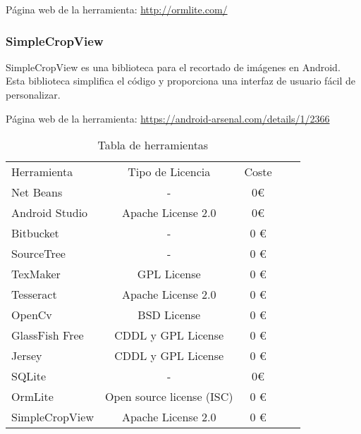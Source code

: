 Página web de la herramienta: \url{http://ormlite.com/}

\subsubsection{SimpleCropView}

SimpleCropView es una biblioteca para el recortado de  imágenes en Android.
Esta biblioteca simplifica el código y proporciona una interfaz de usuario fácil de personalizar.

Página web de la herramienta: \url{https://android-arsenal.com/details/1/2366} 

\begin{table}[]
\centering
\begin{tabular}{l c c c c}
\toprule
    Herramienta    & Tipo de Licencia          & Coste \\
    \otoprule
Net Beans      &            -                & 0\euro       \\
Android Studio & Apache License 2.0        & 0\euro      \\
Bitbucket      & -                         & 0 \euro     \\
SourceTree     & -                         & 0 \euro     \\
TexMaker       & GPL License               & 0 \euro    \\
Tesseract      & Apache License 2.0        & 0 \euro      \\
OpenCv         & BSD License               & 0 \euro      \\
GlassFish Free & CDDL y GPL License        & 0 \euro      \\
Jersey         & CDDL y GPL License        & 0 \euro      \\
SQLite         & -                         & 0\euro    \\
OrmLite        & Open source license (ISC) & 0 \euro     \\
SimpleCropView & Apache License 2.0        & 0 \euro   \\
\bottomrule 
\end{tabular}
\label{herramientas}
\caption{Tabla de herramientas}
\end{table}
